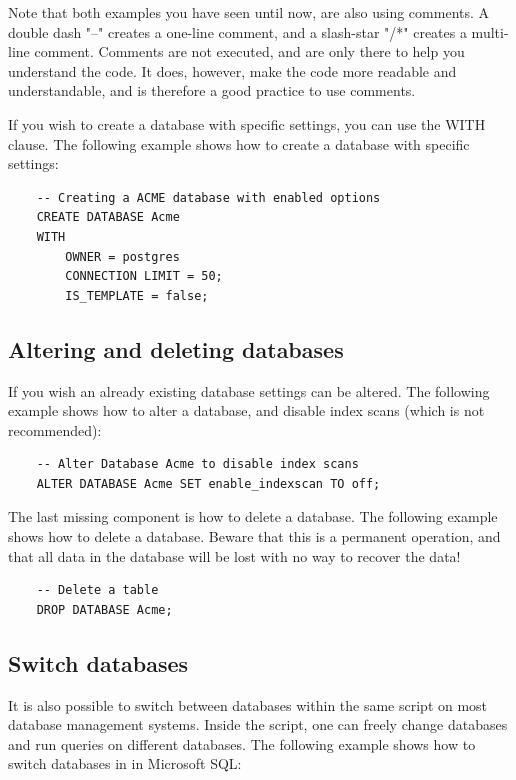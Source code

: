 Note that both examples you have seen until now, are also using comments. A double dash "--" creates a one-line comment, and a slash-star "/*" creates a multi-line comment. Comments are not executed, and are only there to help you understand the code. It does, however, make the code more readable and understandable, and is therefore a good practice to use comments.

If you wish to create a database with specific settings, you can use the WITH clause. The following example shows how to create a database with specific settings:

\begin{verbatim}
    -- Creating a ACME database with enabled options
    CREATE DATABASE Acme 
    WITH
        OWNER = postgres
        CONNECTION LIMIT = 50;
        IS_TEMPLATE = false;
\end{verbatim}

\subsection{Altering and deleting databases}
If you wish an already existing database settings can be altered. The following example shows how to alter a database, and disable index scans (which is not recommended):

\begin{verbatim}
    -- Alter Database Acme to disable index scans
    ALTER DATABASE Acme SET enable_indexscan TO off;
\end{verbatim}

The last missing component is how to delete a database. The following example shows how to delete a database. Beware that this is a permanent operation, and that all data in the database will be lost with no way to recover the data!

\begin{verbatim}
    -- Delete a table
    DROP DATABASE Acme;
\end{verbatim}

\subsection{Switch databases}
It is also possible to switch between databases within the same script on most database management systems. Inside the script, one can freely change databases and run queries on different databases. The following example shows how to switch databases in in Microsoft SQL:

